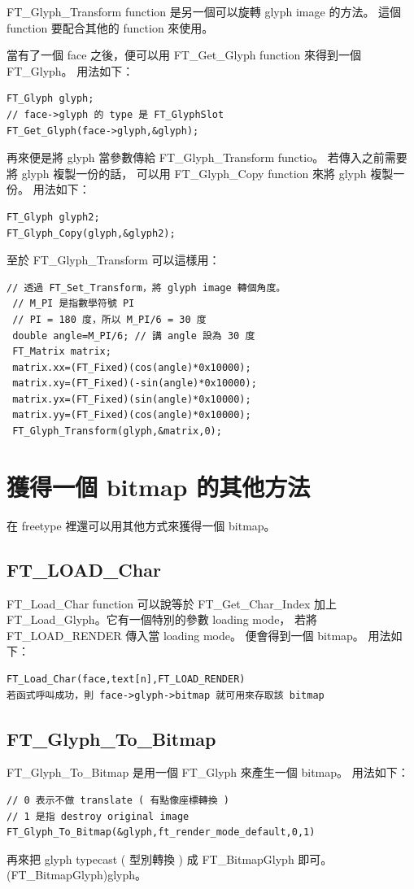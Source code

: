 \documentclass[12pt,a4]{article}
\begin{document}
\begin{CJK}{UTF8}{bsmi}
FT\_{}Glyph\_{}Transform function 是另一個可以旋轉 glyph image 的方法。
這個 function 要配合其他的 function 來使用。

當有了一個 face 之後，便可以用 FT\_{}Get\_{}Glyph function 來得到一個 
FT\_{}Glyph。 用法如下：
\begin{Verbatim}[commandchars=+!?]
FT_Glyph glyph;
// face->glyph 的 type 是 FT_GlyphSlot
FT_Get_Glyph(face->glyph,&glyph);
\end{Verbatim}
再來便是將 glyph 當參數傳給 FT\_{}Glyph\_{}Transform functio。 若傳入之前需要將
glyph 複製一份的話， 可以用 FT\_{}Glyph\_Copy function 來將 glyph 複製一份。
用法如下：
\begin{Verbatim}[commandchars=+!?]
FT_Glyph glyph2;
FT_Glyph_Copy(glyph,&glyph2);
\end{Verbatim}
至於 FT\_{}Glyph\_{}Transform 可以這樣用：
\begin{Verbatim}[commandchars=+!?]
 // 透過 FT_Set_Transform，將 glyph image 轉個角度。
 // M_PI 是指數學符號 PI
 // PI = 180 度，所以 M_PI/6 = 30 度
 double angle=M_PI/6; // 講 angle 設為 30 度
 FT_Matrix matrix;
 matrix.xx=(FT_Fixed)(cos(angle)*0x10000);
 matrix.xy=(FT_Fixed)(-sin(angle)*0x10000);
 matrix.yx=(FT_Fixed)(sin(angle)*0x10000);
 matrix.yy=(FT_Fixed)(cos(angle)*0x10000);
 FT_Glyph_Transform(glyph,&matrix,0);
\end{Verbatim}
\newpage
\section{獲得一個 bitmap 的其他方法}
在 freetype 裡還可以用其他方式來獲得一個 bitmap。
\subsection{FT\_{}LOAD\_{}Char}
FT\_{}Load\_{}Char function 可以說等於 FT\_{}Get\_{}Char\_{}Index 加上 
FT\_{}Load\_{}Glyph。它有一個特別的參數 loading mode，
若將 FT\_{}LOAD\_{}RENDER 傳入當 loading mode。 便會得到一個 bitmap。 用法如下：
\begin{Verbatim}[commandchars=+!?]
FT_Load_Char(face,text[n],FT_LOAD_RENDER)
若函式呼叫成功，則 face->glyph->bitmap 就可用來存取該 bitmap
\end{Verbatim}
\subsection{FT\_{}Glyph\_{}To\_{}Bitmap}
FT\_{}Glyph\_{}To\_{}Bitmap 是用一個 FT\_{}Glyph 來產生一個 bitmap。 用法如下：
\begin{Verbatim}[commandchars=+!?]
// 0 表示不做 translate ( 有點像座標轉換 )
// 1 是指 destroy original image
FT_Glyph_To_Bitmap(&glyph,ft_render_mode_default,0,1)
\end{Verbatim}
再來把 glyph typecast ( 型別轉換 ) 成 FT\_{}BitmapGlyph 即可。
(FT\_{}BitmapGlyph)glyph。




\end{CJK}
\end{document}
